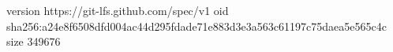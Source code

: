version https://git-lfs.github.com/spec/v1
oid sha256:a24e8f6508dfd004ac44d295fdade71e883d3e3a563c61197c75daea5e565c4c
size 349676
